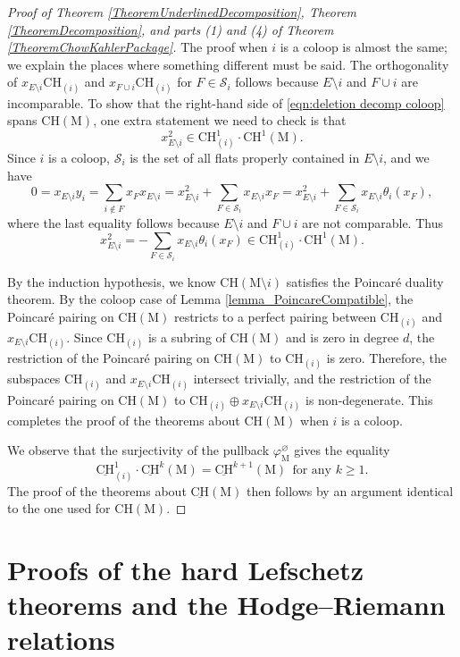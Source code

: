 \documentclass[11pt,reqno]{amsart}
\theoremstyle{definition}
\theoremstyle{remark}
\renewcommand{\(}{\left(}
\renewcommand{\)}{\right)}
\newcommand{\<}{\left<}
\renewcommand{\>}{\right>}
\begin{document}
\begin{proof}[Proof of Theorem \ref{TheoremUnderlinedDecomposition}, Theorem \ref{TheoremDecomposition}, and 
parts (1) and (4) of Theorem \ref{TheoremChowKahlerPackage}]
The proof when $i$ is a coloop is almost the same; we explain the places where something different must be said.  The orthogonality of $x_{E \setminus i}\mathrm{CH}_{(i)}$ and $x_{F\cup i} \mathrm{CH}_{(i)}$ for $F \in \mathscr{S}_i$ follows because $E \setminus i$ and $F\cup i$ are incomparable.  To show that the right-hand side of \eqref{eqn:deletion decomp coloop} spans $\mathrm{CH}(\mathrm{M})$, one extra statement we need to check is that
\[
x_{E\setminus i}^2\in \mathrm{CH}^1_{(i)}\cdot \mathrm{CH}^1(\mathrm{M}).
\] 
Since $i$ is a coloop, $\mathscr{S}_i$ is the set of all flats properly contained in $E\setminus i$, and we have
\[0 = x_{E\setminus i}y_i = \sum_{i\notin F} x_F x_{E\setminus i} = x_{E\setminus i}^2 + \sum_{F\in \mathscr{S}_i}
 x_{E\setminus i}x_F = x_{E\setminus i}^2 + 
\sum_{F\in \mathscr{S}_i} x_{E\setminus i}\theta_i(x_F),\]
where the last equality follows because $E \setminus i$ and $F \cup i$ are not comparable.  Thus
\[
x_{E\setminus i}^2= - \sum_{F\in \mathscr{S}_i} x_{E\setminus i}\theta_i(x_F) \in \mathrm{CH}^1_{(i)}\cdot \mathrm{CH}^1(\mathrm{M}).
\]

By the induction hypothesis, we know $\mathrm{CH}(\mathrm{M}\setminus i)$ satisfies the Poincar\'e duality theorem. By the coloop case of Lemma \ref{lemma_PoincareCompatible}, the Poincar\'e pairing on $\mathrm{CH}(\mathrm{M})$ restricts to a perfect pairing between $\mathrm{CH}_{(i)}$ and $x_{E\setminus i}\mathrm{CH}_{(i)}$. Since $\mathrm{CH}_{(i)}$ is a subring of $\mathrm{CH}(\mathrm{M})$ and is zero in degree $d$, the restriction of the Poincar\'e pairing on $\mathrm{CH}(\mathrm{M})$ to $\mathrm{CH}_{(i)}$ is zero. Therefore, the subspaces $\mathrm{CH}_{(i)}$ and $x_{E\setminus i}\mathrm{CH}_{(i)}$ intersect trivially, and the restriction of the Poincar\'e pairing on $\mathrm{CH}(\mathrm{M})$ to $\mathrm{CH}_{(i)}\oplus x_{E\setminus i}\mathrm{CH}_{(i)}$ is non-degenerate. This completes the proof of the theorems about $\mathrm{CH}(\mathrm{M})$ when $i$ is a coloop. %


We observe that the surjectivity of 
the pullback $\varphi^\varnothing_{\mathrm{M}}$ gives the equality
\[
\underline{\mathrm{CH}}^1_{(i)}\cdot \underline{\mathrm{CH}}^{k}(\mathrm{M})=\underline{\mathrm{CH}}^{k+1}(\mathrm{M}) \ \ \text{for any $k \ge 1$.}
\]
The proof of the theorems about $\underline{\mathrm{CH}}(\mathrm{M})$ then follows by an argument identical to the one used for $\mathrm{CH}(\mathrm{M})$.
\end{proof}

\section{Proofs of the hard Lefschetz theorems and the Hodge--Riemann relations}\label{Section4}
\end{document}
